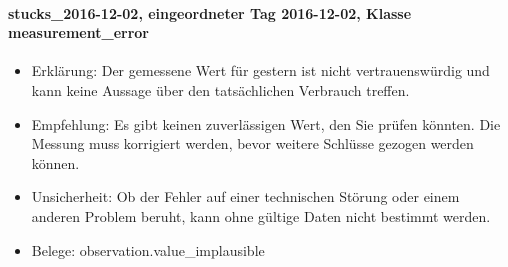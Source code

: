 \paragraph{stucks\_\allowbreak{}2016-12-02, eingeordneter Tag 2016-12-02, Klasse measurement\_\allowbreak{}error}
\begin{itemize}
\item Erklärung: Der gemessene Wert für gestern ist nicht vertrauenswürdig und kann keine Aussage über den tatsächlichen Verbrauch treffen.
\item Empfehlung: Es gibt keinen zuverlässigen Wert, den Sie prüfen könnten. Die Messung muss korrigiert werden, bevor weitere Schlüsse gezogen werden können.
\item Unsicherheit: Ob der Fehler auf einer technischen Störung oder einem anderen Problem beruht, kann ohne gültige Daten nicht bestimmt werden.
\item Belege: observation.value\_\allowbreak{}implausible
\end{itemize}
